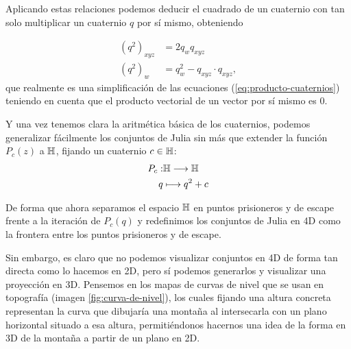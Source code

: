 Aplicando estas relaciones podemos deducir el cuadrado de un cuaternio con tan solo multiplicar un cuaternio $q$ por sí mismo, obteniendo

\begin{equation}
    \label{eq:cuadrado-cuaternio}
    \begin{split}
        (q^2)_{xyz} &= 2q_w q_{xyz} \\
        (q^2)_w &= q_w^2 - q_{xyz}\cdot q_{xyz},
    \end{split}
\end{equation}
que realmente es una simplificación de las ecuaciones (\ref{eq:producto-cuaternios}) teniendo en cuenta que el producto vectorial de un vector por sí mismo es $0$.

Y una vez tenemos clara la aritmética básica de los cuaternios, podemos generalizar fácilmente los conjuntos de Julia sin más que extender la función $P_c(z)$ a $\mathbb{H}$, fijando un cuaternio $c\in\mathbb{H}$:
\begin{equation}
    \label{eq:f-julia-cuaternios}
    \begin{split}
        P_c :& \mathbb{H} \longrightarrow \mathbb{H} \\
        q & \longmapsto q^2 + c
    \end{split}
\end{equation}

De forma que ahora separamos el espacio $\mathbb{H}$ en puntos prisioneros y de escape frente a la iteración de $P_c(q)$ y redefinimos los conjuntos de Julia en 4D como la frontera entre los puntos prisioneros y de escape. 

Sin embargo, es claro que no podemos visualizar conjuntos en 4D de forma tan directa como lo hacemos en 2D, pero sí podemos generarlos y visualizar una proyección en 3D. Pensemos en los mapas de curvas de nivel que se usan en topografía (imagen \ref{fig:curva-de-nivel}), los cuales fijando una altura concreta representan la curva que dibujaría una montaña al intersecarla con un plano horizontal situado a esa altura, permitiéndonos hacernos una idea de la forma en 3D de la montaña a partir de un plano en 2D. 

